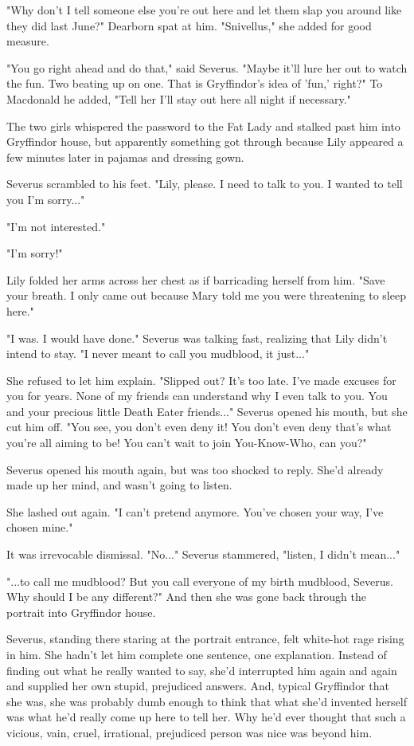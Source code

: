 \documentclass[a4paper,11pt]{article}
\begin{document}
"Why don't I tell someone else you're out here and let them slap you around like they did last June?" Dearborn spat at him. "Snivellus," she added for good measure.

"You go right ahead and do that," said Severus. "Maybe it'll lure her out to watch the fun. Two beating up on one. That is Gryffindor's idea of 'fun,' right?" To Macdonald he added, "Tell her I'll stay out here all night if necessary."

The two girls whispered the password to the Fat Lady and stalked past him into Gryffindor house, but apparently something got through because Lily appeared a few minutes later in pajamas and dressing gown.

Severus scrambled to his feet. "Lily, please. I need to talk to you. I wanted to tell you I'm sorry..."

"I'm not interested."

"I'm sorry!"

Lily folded her arms across her chest as if barricading herself from him. "Save your breath. I only came out because Mary told me you were threatening to sleep here."

"I was. I would have done." Severus was talking fast, realizing that Lily didn't intend to stay. "I never meant to call you mudblood, it just..."

She refused to let him explain. "Slipped out? It's too late. I've made excuses for you for years. None of my friends can understand why I even talk to you. You and your precious little Death Eater friends..." Severus opened his mouth, but she cut him off. "You see, you don't even deny it! You don't even deny that's what you're all aiming to be! You can't wait to join You-Know-Who, can you?"

Severus opened his mouth again, but was too shocked to reply. She'd already made up her mind, and wasn't going to listen.

She lashed out again. "I can't pretend anymore. You've chosen your way, I've chosen mine."

It was irrevocable dismissal. "No..." Severus stammered, "listen, I didn't mean..."

"...to call me mudblood? But you call everyone of my birth mudblood, Severus. Why should I be any different?" And then she was gone back through the portrait into Gryffindor house.

Severus, standing there staring at the portrait entrance, felt white-hot rage rising in him. She hadn't let him complete one sentence, one explanation. Instead of finding out what he really wanted to say, she'd interrupted him again and again and supplied her own stupid, prejudiced answers. And, typical Gryffindor that she was, she was probably dumb enough to think that what she'd invented herself was what he'd really come up here to tell her. Why he'd ever thought that such a vicious, vain, cruel, irrational, prejudiced person was nice was beyond him.
\end{document}
